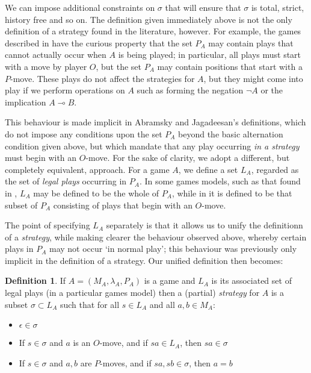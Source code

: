 \documentclass[11pt]{article} %
\theoremstyle{plain} %
\theoremstyle{definition} %
\newtheorem{definition}[theorem]{Definition}
\theoremstyle{note}
\theoremstyle{exercisestyle}
\renewcommand{\implies}{\multimap}
\newcommand{\emptyplay}{\epsilon}
\begin{document}
We can impose additional constraints on $\sigma$ that will ensure that $\sigma$ is total, strict, history free and so on.  The definition given immediately above is not the only definition of a strategy found in the literature, however.  For example, the games described in \cite{abramskyjagadeesangames} have the curious property that the set $P_A$ may contain plays that cannot actually occur when $A$ is being played; in particular, all plays must start with a move by player $O$, but the set $P_A$ may contain positions that start with a $P$-move.  These plays do not affect the strategies for $A$, but they might come into play if we perform operations on $A$ such as forming the negation $\neg A$ or the implication $A\implies B$.  

This behaviour is made implicit in Abramsky and Jagadeesan's definitions, which do not impose any conditions upon the set $P_A$ beyond the basic alternation condition given above, but which mandate that any play occurring \emph{in a strategy} must begin with an $O$-move.  For the sake of clarity, we adopt a different, but completely equivalent, approach.  For a game $A$, we define a set $L_A$, regarded as the set of \emph{legal plays} occurring in $P_A$.  In some games models, such as that found in \cite{blassgames}, $L_A$ may be defined to be the whole of $P_A$, while in \cite{abramskyjagadeesangames} it is defined to be that subset of $P_A$ consisting of plays that begin with an $O$-move.

The point of specifying $L_A$ separately is that it allows us to unify the definitionn of a \emph{strategy}, while making clearer the behaviour observed above, whereby certain plays in $P_A$ may not occur `in normal play'; this behaviour was previously only implicit in the definition of a strategy.  Our unified definition then becomes:

\begin{definition}
  If $A=(M_A,\lambda_A,P_A)$ is a game and $L_A$ is its associated set of legal plays (in a particular games model) then a (partial) \emph{strategy} for $A$ is a subset $\sigma\subset L_A$ such that for all $s\in L_A$ and all $a, b\in M_A$:
  \begin{itemize}
    \item $\emptyplay\in\sigma$
    \item If $s\in\sigma$ and $a$ is an $O$-move, and if $sa\in L_A$, then $sa\in\sigma$
    \item If $s\in\sigma$ and $a,b$ are $P$-moves, and if $sa,sb\in\sigma$, then $a=b$
  \end{itemize}
\end{definition}
\end{document}

